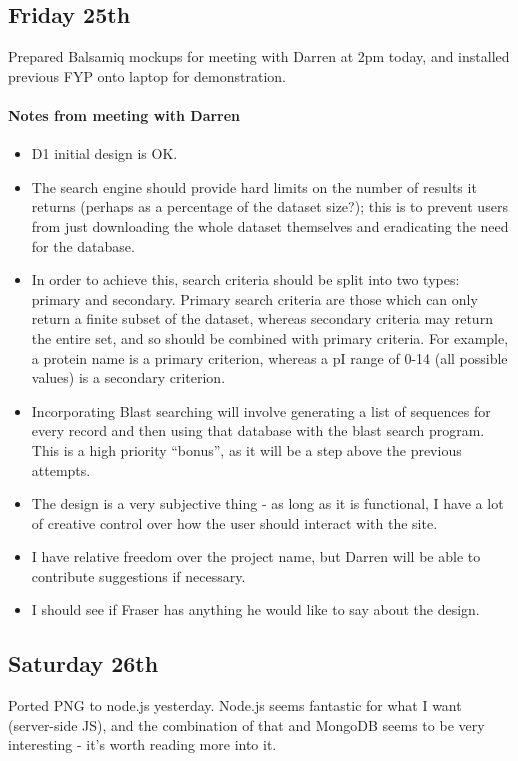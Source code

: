 \subsection{Friday 25th}
Prepared Balsamiq mockups for meeting with Darren at 2pm today, and installed
previous FYP onto laptop for demonstration.

\paragraph{Notes from meeting with Darren}
\begin{itemize}
\item D1 initial design is OK.
\item The search engine should provide hard limits on the number of results it
  returns (perhaps as a percentage of the dataset size?); this is to prevent
  users from just downloading the whole dataset themselves and eradicating the
  need for the database.
\item In order to achieve this, search criteria should be split into two types:
  primary and secondary. Primary search criteria are those which can only return
  a finite subset of the dataset, whereas secondary criteria may return the
  entire set, and so should be combined with primary criteria. For example, a
  protein name is a primary criterion, whereas a pI range of 0-14 (all possible
  values) is a secondary criterion.
\item Incorporating Blast searching will involve generating a list of sequences
  for every record and then using that database with the blast search
  program. This is a high priority ``bonus'', as it will be a step above the
  previous attempts.
\item The design is a very subjective thing - as long as it is functional, I
  have a lot of creative control over how the user should interact with the
  site.
\item I have relative freedom over the project name, but Darren will be able to
  contribute suggestions if necessary.
\item I should see if Fraser has anything he would like to say about the design.
\end{itemize}

\subsection{Saturday 26th}
Ported PNG to node.js yesterday. Node.js seems fantastic for what I
want (server-side JS), and the combination of that and MongoDB seems
to be very interesting - it's worth reading more into it.

